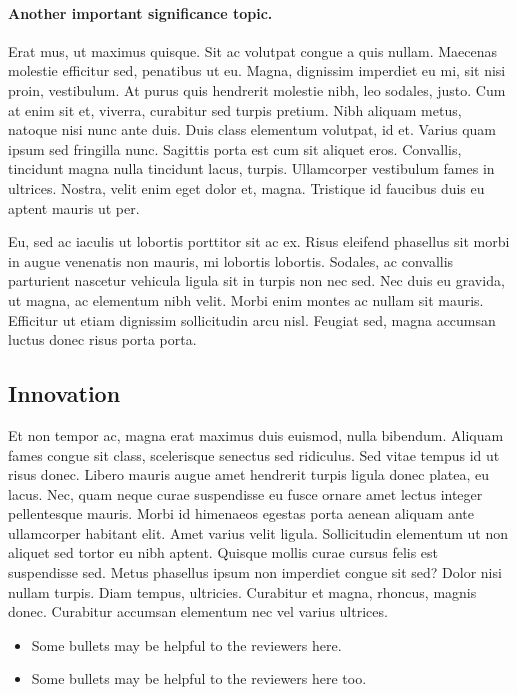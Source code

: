 \documentclass[11pt,]{article}
\providecommand{\tightlist}{%
  \setlength{\itemsep}{0pt}\setlength{\parskip}{0pt}}
\let\oldparagraph\paragraph
\renewcommand{\paragraph}[1]{\oldparagraph{#1}\mbox{}}
\begin{document}
\hypertarget{another-important-significance-topic.}{%
\paragraph{Another important significance
topic.}\label{another-important-significance-topic.}}

Erat mus, ut maximus quisque. Sit ac volutpat congue a quis nullam.
Maecenas molestie efficitur sed, penatibus ut eu. Magna, dignissim
imperdiet eu mi, sit nisi proin, vestibulum. At purus quis hendrerit
molestie nibh, leo sodales, justo. Cum at enim sit et, viverra,
curabitur sed turpis pretium. Nibh aliquam metus, natoque nisi nunc ante
duis. Duis class elementum volutpat, id et. Varius quam ipsum sed
fringilla nunc. Sagittis porta est cum sit aliquet eros. Convallis,
tincidunt magna nulla tincidunt lacus, turpis. Ullamcorper vestibulum
fames in ultrices. Nostra, velit enim eget dolor et, magna. Tristique id
faucibus duis eu aptent mauris ut per.

Eu, sed ac iaculis ut lobortis porttitor sit ac ex. Risus eleifend
phasellus sit morbi in augue venenatis non mauris, mi lobortis lobortis.
Sodales, ac convallis parturient nascetur vehicula ligula sit in turpis
non nec sed. Nec duis eu gravida, ut magna, ac elementum nibh velit.
Morbi enim montes ac nullam sit mauris. Efficitur ut etiam dignissim
sollicitudin arcu nisl. Feugiat sed, magna accumsan luctus donec risus
porta porta.

\hypertarget{innovation}{%
\subsection{Innovation}\label{innovation}}

Et non tempor ac, magna erat maximus duis euismod, nulla bibendum.
Aliquam fames congue sit class, scelerisque senectus sed ridiculus. Sed
vitae tempus id ut risus donec. Libero mauris augue amet hendrerit
turpis ligula donec platea, eu lacus. Nec, quam neque curae suspendisse
eu fusce ornare amet lectus integer pellentesque mauris. Morbi id
himenaeos egestas porta aenean aliquam ante ullamcorper habitant elit.
Amet varius velit ligula. Sollicitudin elementum ut non aliquet sed
tortor eu nibh aptent. Quisque mollis curae cursus felis est suspendisse
sed. Metus phasellus ipsum non imperdiet congue sit sed? Dolor nisi
nullam turpis. Diam tempus, ultricies. Curabitur et magna, rhoncus,
magnis donec. Curabitur accumsan elementum nec vel varius ultrices.

\begin{itemize}
\tightlist
\item
  Some bullets may be helpful to the reviewers here.
\item
  Some bullets may be helpful to the reviewers here too.
\end{itemize}
\end{document}
